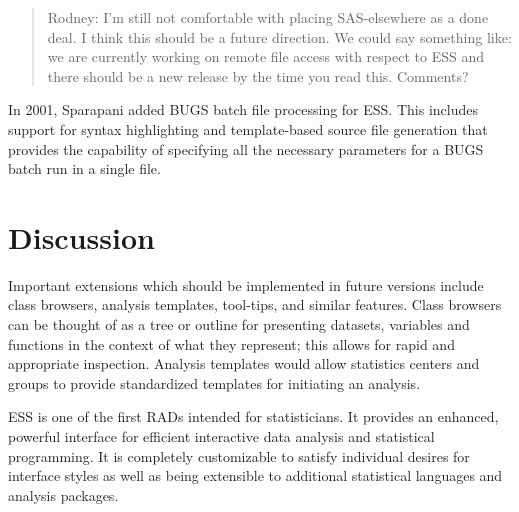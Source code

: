 \documentclass{article}
\begin{document}
\begin{quote}
 Rodney:  I'm still not comfortable with placing SAS-elsewhere as
a done deal.  I think this should be a future direction.
We could say something like:  we are currently working on remote
file access with respect to ESS and there should be a new
release by the time you read this.  Comments?
\end{quote}

In 2001, Sparapani added BUGS batch file processing for ESS.  This
includes support for syntax highlighting and template-based source file
generation that provides the capability of specifying all the necessary
parameters for a BUGS batch run in a single file.

\section{Discussion}
\label{sec:discussion}



Important extensions which should be implemented in future
versions include class browsers, analysis templates, tool-tips, and
similar features.  Class browsers can be thought of as a tree or
outline for presenting datasets, variables and functions in the
context of what they represent; this allows for rapid and appropriate
inspection.  Analysis templates would allow statistics centers and
groups to provide standardized templates for initiating an analysis.

ESS is one of the first RADs intended for statisticians.  It provides
an enhanced, powerful interface for efficient interactive data
analysis and statistical programming.  It is completely customizable
to satisfy individual desires for interface styles as well as being
extensible to additional statistical languages and analysis packages.




\end{document}
